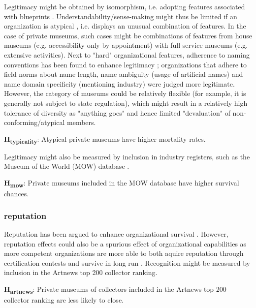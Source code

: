 \documentclass[11pt]{article}
\begin{document}
Legitimacy might be obtained by isomorphism, i.e. adopting features associated with blueprints \parencite{diMaggio_1983_iron}.
Understandability/sense-making \parencite{Glynn_Abzug_2002_names} might thus be limited if an organization is atypical \parencite{Rosch_1975_family}, i.e. displays an unusual combination of features.
In the case of private museums, such cases might be combinations of features from house museums (e.g. accessibility only by appointment) with full-service museums (e.g. extensive activities). 
Next to "hard" organizational features, adherence to naming conventions has been found to enhance legitimacy \parencite{Glynn_Abzug_2002_names}; organizations that adhere to field norms about name length, name ambiguity (usage of artificial names) and name domain specificity (mentioning industry) were judged more legitimate. 
However, the category of museums could be relatively flexible (for example, it is generally not subject to state regulation), which might result in a relatively high tolerance of diversity as "anything goes" and hence limited "devaluation" of non-conforming/atypical members. 

\bigbreak
\noindent
\textbf{H\textsubscript{typicality}}: Atypical private museums have higher mortality rates.

Legitimacy might also be measured by inclusion in industry registers, such as the Museum of the World (MOW) database \parencite{deGruyter_2021_MOW}.

\bigbreak
\noindent
\textbf{H\textsubscript{mow}}: Private museums included in the MOW database have higher survival chances.



\subsubsection*{reputation}


Reputation has been argued to enhance organizational survival \parencite{Rao_1994_reputation}.
However, reputation effects could also be a spurious effect of organizational capabilities as more competent organizations are more able to both aquire reputation through certification contests and survive in long run \parencite{Goldfarb_Zavyalova_Pillai_2018_Rao}.
Recognition might be measured by inclusion in the Artnews top 200 collector ranking.

\bigbreak
\noindent
\textbf{H\textsubscript{artnews}}: Private museums of collectors included in the Artnews top 200 collector ranking are less likely to close. 
\end{document}

